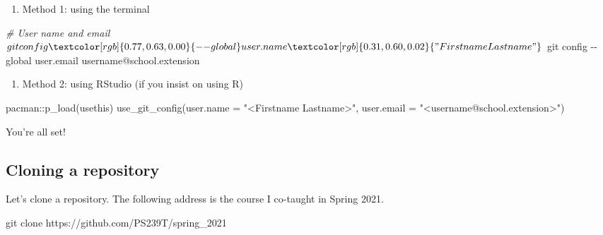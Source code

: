 \documentclass[
]{book}
\newenvironment{Shaded}{\begin{snugshade}}{\end{snugshade}}
\newcommand{\AttributeTok}[1]{\textcolor[rgb]{0.77,0.63,0.00}{#1}}
\newcommand{\CommentTok}[1]{\textcolor[rgb]{0.56,0.35,0.01}{\textit{#1}}}
\newcommand{\ExtensionTok}[1]{#1}
\newcommand{\FunctionTok}[1]{\textcolor[rgb]{0.00,0.00,0.00}{#1}}
\newcommand{\NormalTok}[1]{#1}
\newcommand{\SpecialCharTok}[1]{\textcolor[rgb]{0.00,0.00,0.00}{#1}}
\newcommand{\StringTok}[1]{\textcolor[rgb]{0.31,0.60,0.02}{#1}}
\providecommand{\tightlist}{%
  \setlength{\itemsep}{0pt}\setlength{\parskip}{0pt}}
\begin{document}
\begin{enumerate}
\def\labelenumi{\arabic{enumi}.}
\tightlist
\item
  Method 1: using the terminal
\end{enumerate}

\begin{Shaded}
\begin{Highlighting}[]

\CommentTok{\# User name and email }
\ExtensionTok{$}\NormalTok{ git config }\AttributeTok{{-}{-}global}\NormalTok{ user.name }\StringTok{"Firstname Lastname"}
\ExtensionTok{$}\NormalTok{ git config }\AttributeTok{{-}{-}global}\NormalTok{ user.email username@school.extension}
\end{Highlighting}
\end{Shaded}

\begin{enumerate}
\def\labelenumi{\arabic{enumi}.}
\setcounter{enumi}{1}
\tightlist
\item
  Method 2: using RStudio (if you insist on using R)
\end{enumerate}

\begin{Shaded}
\begin{Highlighting}[]
\NormalTok{pacman}\SpecialCharTok{::}\FunctionTok{p\_load}\NormalTok{(usethis)}
\FunctionTok{use\_git\_config}\NormalTok{(}\AttributeTok{user.name =} \StringTok{"\textless{}Firstname Lastname\textgreater{}"}\NormalTok{,}
               \AttributeTok{user.email =} \StringTok{"\textless{}username@school.extension\textgreater{}"}\NormalTok{)}
\end{Highlighting}
\end{Shaded}

You're all set!

\hypertarget{cloning-a-repository}{%
\subsection{Cloning a repository}\label{cloning-a-repository}}

Let's clone a repository. The following address is the course I co-taught in Spring 2021.

\begin{Shaded}
\begin{Highlighting}[]
\FunctionTok{git}\NormalTok{ clone https://github.com/PS239T/spring\_2021}
\end{Highlighting}
\end{Shaded}
\end{document}
